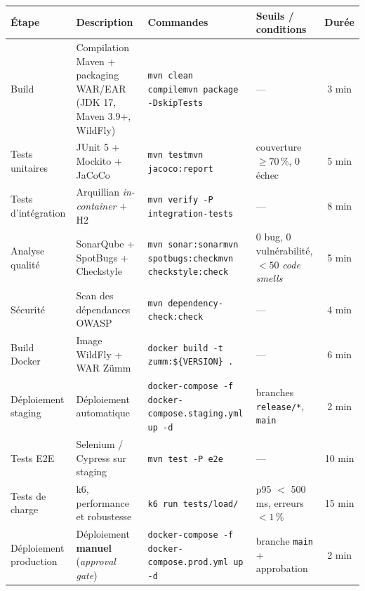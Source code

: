 \begin{center}
\small
\setlength{\tabcolsep}{4pt}%
\begin{tabular}{p{2.3cm}p{4.4cm}p{4.7cm}p{3.0cm}c}
\toprule
\textbf{Étape} & \textbf{Description} & \textbf{Commandes} & \textbf{Seuils / conditions} & \textbf{Durée} \\
\midrule
Build & Compilation Maven + packaging WAR/EAR (JDK 17, Maven 3.9+, WildFly)
  & \texttt{mvn clean compile}\newline \texttt{mvn package -DskipTests}
  & --- & 3 min \\
\addlinespace
Tests unitaires & JUnit 5 + Mockito + JaCoCo
  & \texttt{mvn test}\newline \texttt{mvn jacoco:report}
  & couverture $\geq 70\,\%$, 0 échec & 5 min \\
\addlinespace
Tests d'intégration & Arquillian \emph{in-container} + H2
  & \texttt{mvn verify -P integration-tests}
  & --- & 8 min \\
\addlinespace
Analyse qualité & SonarQube + SpotBugs + Checkstyle
  & \texttt{mvn sonar:sonar}\newline \texttt{mvn spotbugs:check}\newline \texttt{mvn checkstyle:check}
  & 0 bug, 0 vulnérabilité, $<50$ \emph{code smells} & 5 min \\
\addlinespace
Sécurité & Scan des dépendances OWASP
  & \texttt{mvn dependency-check:check}
  & --- & 4 min \\
\addlinespace
Build Docker & Image WildFly + WAR Zümm
  & \texttt{docker build -t zumm:\$\{VERSION\} .}
  & --- & 6 min \\
\addlinespace
Déploiement staging & Déploiement automatique
  & \texttt{docker-compose -f docker-compose.staging.yml up -d}
  & branches \texttt{release/*}, \texttt{main} & 2 min \\
\addlinespace
Tests E2E & Selenium / Cypress sur staging
  & \texttt{mvn test -P e2e}
  & --- & 10 min \\
\addlinespace
Tests de charge & k6, performance et robustesse
  & \texttt{k6 run tests/load/}
  & p95 $<$ 500 ms, erreurs $<1\,\%$ & 15 min \\
\addlinespace
Déploiement production & Déploiement \textbf{manuel} (\emph{approval gate})
  & \texttt{docker-compose -f docker-compose.prod.yml up -d}
  & branche \texttt{main} + approbation & 2 min \\
\bottomrule
\end{tabular}
\end{center}

